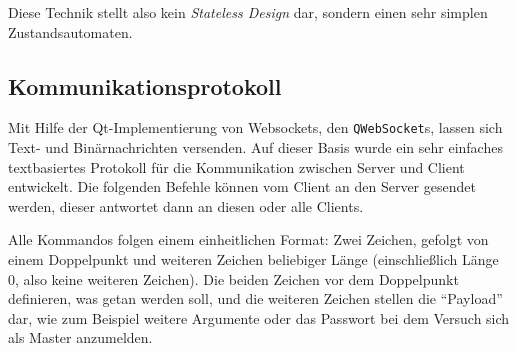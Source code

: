 Diese Technik stellt also kein \textit{Stateless Design} dar, sondern einen sehr simplen Zustandsautomaten.

\subsection{Kommunikationsprotokoll}
Mit Hilfe der Qt-Implementierung von Websockets, den \verb+QWebSocket+s, lassen sich Text- und Binärnachrichten versenden. Auf dieser Basis wurde ein sehr einfaches textbasiertes Protokoll für die Kommunikation zwischen Server und Client entwickelt. Die folgenden Befehle können vom Client an den Server gesendet werden, dieser antwortet dann an diesen oder alle Clients.

Alle Kommandos folgen einem einheitlichen Format: Zwei Zeichen, gefolgt von einem Doppelpunkt und weiteren Zeichen beliebiger Länge (einschließlich Länge 0, also keine weiteren Zeichen). Die beiden Zeichen vor dem Doppelpunkt definieren, was getan werden soll, und die weiteren Zeichen stellen die "`Payload"' dar, wie zum Beispiel weitere Argumente oder das Passwort bei dem Versuch sich als Master anzumelden.
